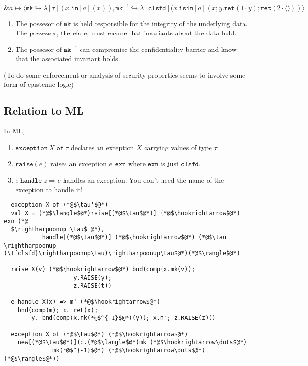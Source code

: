 \documentclass[11pt]{article}
\newcommand{\T}[1]{\ensuremath{\mathtt{#1}}}
\newcommand{\Lunit}{\ensuremath{\langle\rangle}}
\begin{document}
$$\& a \mapsto\langle \T{mk}\hookrightarrow \lambda[\tau](x.\T{in}[a](x)),
\T{mk}^{-1}\hookrightarrow
\lambda[\T{clsfd}](x.\T{isin}[a](x;y.\T{ret}(1\cdot y);
\T{ret}(2\cdot\Lunit))\rangle$$

\begin{enumerate}
\item The possesor of $\T{mk}$ is held responsible for the
\underline{integrity} of the underlying data.  The possessor, therefore,
must ensure that invariants about the data hold.
\item The possesor of $\T{mk}^{-1}$ can compromise the confidentiality
barrier and know that the associated invariant holds.
\end{enumerate}

(To do some enforcement or analysis of security properties seems to involve
some form of epistemic logic)

\vspace{1em}

\subsection{Relation to ML}

In ML,
\begin{enumerate}
\item $\T{exception}\ X \;\T{of}\; \tau$ declares an exception $X$ carrying
values of type $\tau$.
\item $\T{raise}(e)$ raises an exception $e : \T{exn}$ where $\T{exn}$ is just
$\T{clsfd}$.
\item $e\;\T{handle}\; z\Rightarrow e$ handles an exception: You don't
need the name of the exception to handle it!
\end{enumerate}

\begin{lstlisting}
  exception X of (*@$\tau'$@*)
  val X = (*@$\langle$@*)raise[(*@$\tau$@*)] (*@$\hookrightarrow$@*) exn (*@
  $\rightharpoonup \tau$ @*),
           handle[(*@$\tau$@*)] (*@$\hookrightarrow$@*) (*@$\tau \rightharpoonup
(\T{clsfd}\rightharpoonup\tau)\rightharpoonup\tau$@*)(*@$\rangle$@*)

  raise X(v) (*@$\hookrightarrow$@*) bnd(comp(x.mk(v));
                    y.RAISE(y);
                    z.RAISE(t))

  e handle X(x) => m' (*@$\hookrightarrow$@*)
    bnd(comp(m); x. ret(x);
        y. bnd(comp(x.mk(*@$^{-1}$@*)(y)); x.m'; z.RAISE(z)))

  exception X of (*@$\tau$@*) (*@$\hookrightarrow$@*)
    new[(*@$\tau$@*)](c.(*@$\langle$@*)mk (*@$\hookrightarrow\dots$@*)
              mk(*@$^{-1}$@*) (*@$\hookrightarrow\dots$@*)(*@$\rangle$@*))
\end{lstlisting}
\end{document}
